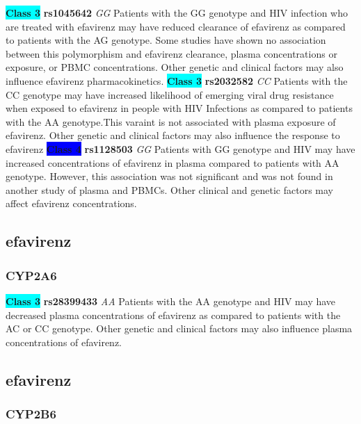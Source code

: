 \documentclass{book}
\begin{document}
\begin{center}
\textbf{\colorbox{cyan} {Class 3}} \textbf{ rs1045642 } \textit{ GG }
Patients with the GG genotype and HIV infection who are treated with efavirenz may have reduced clearance of efavirenz as compared to patients with the AG genotype. Some studies have shown no association between this polymorphism and efavirenz clearance, plasma concentrations or exposure, or PBMC concentrations. Other genetic and clinical factors may also influence efavirenz pharmacokinetics. \textbf{\colorbox{cyan} {Class 3}} \textbf{ rs2032582 } \textit{ CC }
Patients with the CC genotype may have increased likelihood of emerging viral drug resistance when exposed to efavirenz in people with HIV Infections as compared to patients with the AA genotype.This varaint is not associated with plasma exposure of efavirenz. Other genetic and clinical factors may also influence the response to efavirenz
\textbf{\colorbox{blue} {Class 4}} \textbf{ rs1128503 } \textit{ GG }
Patients with GG genotype and HIV may have increased concentrations of efavirenz in plasma compared to patients with AA genotype. However, this association was not significant and was not found in another study of plasma and PBMCs.  Other clinical and genetic factors may affect efavirenz concentrations.

\end{center}\subsection{ efavirenz }


\subsubsection{ CYP2A6 }

\begin{center}
\textbf{\colorbox{cyan} {Class 3}} \textbf{ rs28399433 } \textit{ AA }
Patients with the AA genotype and HIV may have decreased plasma concentrations of efavirenz as compared to patients with the AC or CC genotype. Other genetic and clinical factors may also influence plasma concentrations of efavirenz.


\end{center}\subsection{ efavirenz }


\subsubsection{ CYP2B6 }
\end{document}
